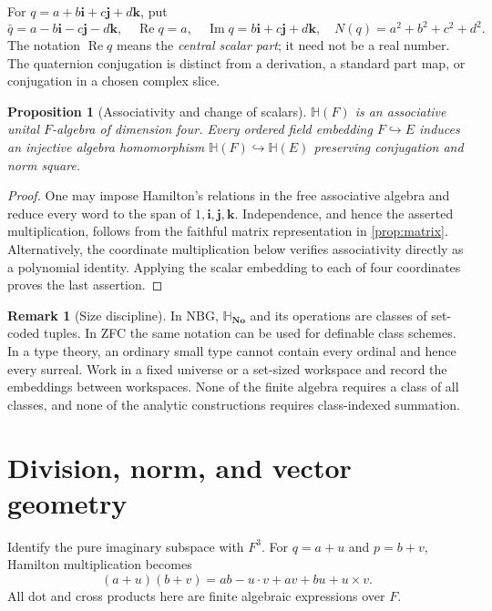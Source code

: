\documentclass[11pt,letterpaper]{article}
\newtheorem{proposition}[theorem]{Proposition}
\theoremstyle{definition}
\newtheorem{remark}[theorem]{Remark}
\newcommand{\No}{\mathbf{No}}
\newcommand{\HH}{\mathbb H}
\newcommand{\SQ}{\mathbb H_{\No}}
\newcommand{\ii}{\mathbf i}
\newcommand{\jj}{\mathbf j}
\newcommand{\kk}{\mathbf k}
\DeclareMathOperator{\Rea}{Re}
\DeclareMathOperator{\Imag}{Im}
\begin{document}
For $q=a+b\ii+c\jj+d\kk$, put
\[
 \bar q=a-b\ii-c\jj-d\kk,\quad
 \Rea q=a,\quad \Imag q=b\ii+c\jj+d\kk,\quad
 N(q)=a^2+b^2+c^2+d^2.
\]
The notation $\Rea q$ means the \emph{central scalar part}; it need not be a real
number. The quaternion conjugation is distinct from a derivation, a standard
part map, or conjugation in a chosen complex slice.

\begin{proposition}[Associativity and change of scalars]
$\HH(F)$ is an associative unital $F$-algebra of dimension four. Every ordered
field embedding $F\hookrightarrow E$ induces an injective algebra homomorphism
$\HH(F)\hookrightarrow\HH(E)$ preserving conjugation and norm square.
\end{proposition}
\begin{proof}
One may impose Hamilton's relations in the free associative algebra and reduce
every word to the span of $1,\ii,\jj,\kk$. Independence, and hence the asserted
multiplication, follows from the faithful matrix representation in
\cref{prop:matrix}. Alternatively, the coordinate multiplication below verifies
associativity directly as a polynomial identity. Applying the scalar embedding
to each of four coordinates proves the last assertion.
\end{proof}

\begin{remark}[Size discipline]
In NBG, $\SQ$ and its operations are classes of set-coded tuples. In ZFC the same
notation can be used for definable class schemes. In a type theory, an ordinary
small type cannot contain every ordinal and hence every surreal. Work in a
fixed universe or a set-sized workspace and record the embeddings between
workspaces. None of the finite algebra requires a class of all classes, and
none of the analytic constructions requires class-indexed summation.
\end{remark}

\section{Division, norm, and vector geometry}
\label{sec:algebra}
Identify the pure imaginary subspace with $F^3$. For $q=a+u$ and $p=b+v$,
Hamilton multiplication becomes
\begin{equation}
 (a+u)(b+v)=ab-u\cdot v+av+bu+u\times v.
 \label{eq:dotcross}
\end{equation}
All dot and cross products here are finite algebraic expressions over $F$.
\end{document}
